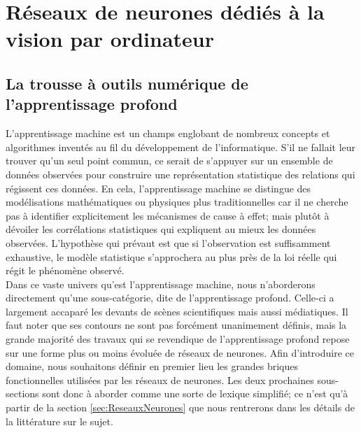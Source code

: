 \section{Réseaux de neurones dédiés à la vision par ordinateur}
\label{sec:IntroductionVisionOrdinateur}
\subsection{La trousse à outils numérique de l'apprentissage profond}

L'apprentissage machine est un champs englobant de nombreux concepts et algorithmes inventés au fil du développement de l'informatique. S'il ne fallait leur trouver qu'un seul point commun, ce serait de s'appuyer sur un ensemble de données observées pour construire une représentation statistique des relations qui régissent ces données. En cela, l'apprentissage machine se distingue des modélisations mathématiques ou physiques plus traditionnelles car il ne cherche pas à identifier explicitement les mécanismes de cause à effet; mais plutôt à dévoiler les corrélations statistiques qui expliquent au mieux les données observées. L'hypothèse qui prévaut est que si l'observation est suffisamment exhaustive, le modèle statistique s'approchera au plus près de la loi réelle qui régit le phénomène observé. \\
Dans ce vaste univers qu'est l'apprentissage machine, nous n'aborderons directement qu'une sous-catégorie, dite de l'apprentissage profond. Celle-ci a largement accaparé les devants de scènes scientifiques mais aussi médiatiques. Il faut noter que ses contours ne sont pas forcément unanimement définis, mais la grande majorité des travaux qui se revendique de l'apprentissage profond repose sur une forme plus ou moins évoluée de réseaux de neurones. 
Afin d'introduire ce domaine, nous souhaitons définir en premier lieu les grandes briques fonctionnelles utilisées par les réseaux de neurones. Les deux prochaines sous-sections sont donc à aborder comme une sorte de lexique simplifié; ce n'est qu'à partir de la section \ref{sec:ReseauxNeurones} que nous rentrerons dans les détails de la littérature sur le sujet.


